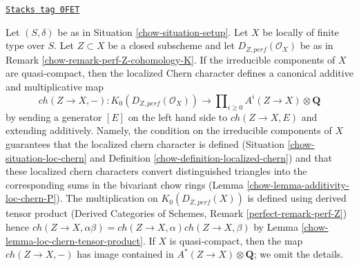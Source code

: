 \begin{remark}
\label{chow-remark-localized-chern-character-K}
\href{https://stacks.math.columbia.edu/tag/0FET}{\texttt{Stacks tag 0FET}}

Let $(S, \delta)$ be as in Situation \ref{chow-situation-setup}.
Let $X$ be locally of finite type over $S$.
Let $Z \subset X$ be a closed subscheme and let
$D_{Z, perf}(\mathcal{O}_X)$ be as in
Remark \ref{chow-remark-perf-Z-cohomology-K}.
If the irreducible components of $X$ are quasi-compact, then
the localized Chern character defines a canonical additive
and multiplicative map
$$
ch(Z \to X, -) : K_0(D_{Z, perf}(\mathcal{O}_X)) \longrightarrow
\prod\nolimits_{i \geq 0} A^i(Z \to X) \otimes \mathbf{Q}
$$
by sending a generator $[E]$ on the left hand side to
$ch(Z \to X, E)$ and extending additively.
Namely, the condition on the irreducible components of $X$ guarantees that the
localized chern character is defined (Situation \ref{chow-situation-loc-chern} and
Definition \ref{chow-definition-localized-chern})
and that these localized chern characters
convert distinguished triangles into the corresponding
sums in the bivariant chow rings
(Lemma \ref{chow-lemma-additivity-loc-chern-P}).
The multiplication on
$K_0(D_{Z, perf}(X))$ is defined using derived tensor product
(Derived Categories of Schemes, Remark \ref{perfect-remark-perf-Z})
hence $ch(Z \to X, \alpha \beta) = ch(Z \to X, \alpha) ch(Z \to X, \beta)$ by
Lemma \ref{chow-lemma-loc-chern-tensor-product}.
If $X$ is quasi-compact, then the map $ch(Z \to X, -)$ has
image contained in $A^*(Z \to X) \otimes \mathbf{Q}$; we omit
the details.
\end{remark}

